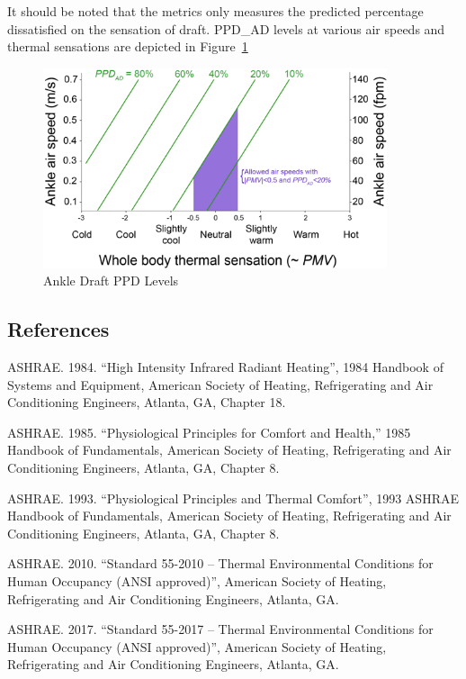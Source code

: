 It should be noted that the metrics only measures the predicted percentage dissatisfied on the sensation of draft. PPD_AD levels at various air speeds and thermal sensations are depicted in Figure~\ref{fig:ankle-draft-ppd}

\begin{figure}[hbtp]
\centering
\includegraphics[width=0.9\textwidth, height=0.9\textheight, keepaspectratio=true]{media/ankle_draft.png}
\caption{Ankle Draft PPD Levels \protect \label{fig:ankle-draft-ppd}}
\end{figure}

\subsection{References}\label{references-1-012}

ASHRAE. 1984. ``High Intensity Infrared Radiant Heating'', 1984 Handbook of Systems and Equipment, American Society of Heating, Refrigerating and Air Conditioning Engineers, Atlanta, GA, Chapter 18.

ASHRAE. 1985. ``Physiological Principles for Comfort and Health,'' 1985 Handbook of Fundamentals, American Society of Heating, Refrigerating and Air Conditioning Engineers, Atlanta, GA, Chapter 8.

ASHRAE. 1993. ``Physiological Principles and Thermal Comfort'', 1993 ASHRAE Handbook of Fundamentals, American Society of Heating, Refrigerating and Air Conditioning Engineers, Atlanta, GA, Chapter 8.

ASHRAE. 2010. ``Standard 55-2010 -- Thermal Environmental Conditions for Human Occupancy (ANSI approved)'', American Society of Heating, Refrigerating and Air Conditioning Engineers, Atlanta, GA.

ASHRAE. 2017. ``Standard 55-2017 -- Thermal Environmental Conditions for Human Occupancy (ANSI approved)'', American Society of Heating, Refrigerating and Air Conditioning Engineers, Atlanta, GA.

